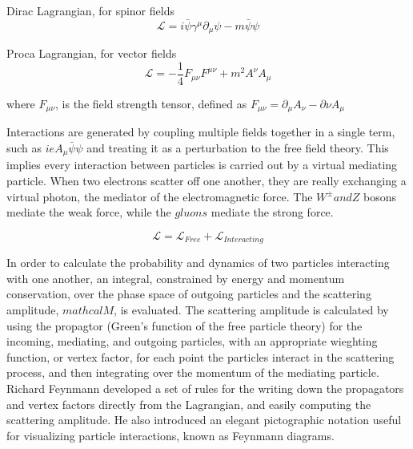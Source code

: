 \noindent Dirac Lagrangian, for spinor fields
\begin{equation}\label{eq:dirac_lagrangian}
\mathcal{L} = i\bar{\psi}\gamma^{\mu}\partial_{\mu}\psi - m\bar{\psi}\psi 
\end{equation}

\noindent Proca Lagrangian, for vector fields
\begin{equation}\label{eq:proca_lagrangian}
\mathcal{L} = -\frac{1}{4}F_{\mu\nu}F^{\mu\nu} + m^{2}A^{\nu}A_{\mu} 
\end{equation}

\noindent where $F_{\mu\nu}$, is the field strength tensor, defined as
$F_{\mu\nu} = \partial_{\mu}A_{\nu} - \partial{\nu}A_{\mu}$

\par Interactions are generated by coupling multiple fields together in a
single term, such as $ieA_{\mu}\bar{\psi}\psi$ and treating it as a
perturbation to the free field theory.  This implies every interaction
between particles is carried out by a virtual mediating particle.  When two
electrons scatter off one another, they are really exchanging a
virtual photon, the mediator of the electromagnetic force.  The
$W^{\pm} and Z$ bosons mediate the weak force, while the $gluons$
mediate the strong force.  

\begin{equation}\label{eq:lagrangian_free_interacting}
\mathcal{L} = \mathcal{L}_{Free} + \mathcal{L}_{Interacting}
\end{equation}

\par In order to calculate the probability and dynamics of two
particles interacting with one another, an integral, constrained by
energy and momentum conservation, over the phase space of outgoing
particles and the scattering amplitude, $mathcal{M}$, is evaluated.
The scattering amplitude is calculated by using the propagtor (Green's
function of the free particle theory) for the incoming, mediating, and
outgoing particles, with an appropriate wieghting function, or vertex
factor, for each point the particles interact in the scattering
process, and then integrating over the momentum of the mediating
particle.  Richard Feynmann developed a set of rules for the writing
down the propagators and vertex factors directly from the Lagrangian,
and easily computing the scattering amplitude.  He also introduced an
elegant pictographic notation useful for visualizing particle
interactions, known as Feynmann diagrams. 

